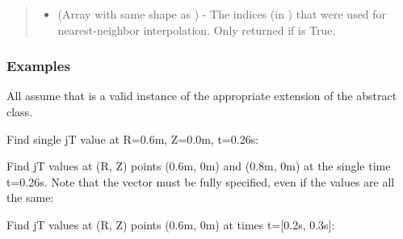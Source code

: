 \documentclass[letterpaper,10pt,english]{sphinxmanual}
\begin{document}
\begin{fulllineitems}
\begin{fulllineitems}
\begin{quote}
\begin{description}
\begin{itemize}
\item {} 
 (Array with same shape as ) - The indices
(in ) that were used for
nearest-neighbor interpolation. Only returned if  is
True.

\end{itemize}


\end{description}\end{quote}
\subsubsection*{Examples}

All assume that  is a valid instance of the appropriate
extension of the {\hyperref[\detokenize{eqtools:eqtools.core.Equilibrium}]{}} abstract class.

Find single jT value at R=0.6m, Z=0.0m, t=0.26s:

\begin{sphinxVerbatim}[commandchars=\\\{\}]
    
\end{sphinxVerbatim}

Find jT values at (R, Z) points (0.6m, 0m) and (0.8m, 0m) at the
single time t=0.26s. Note that the  vector must be fully
specified, even if the values are all the same:

\begin{sphinxVerbatim}[commandchars=\\\{\}]
  \PYG{p}{[} \PYG{p}{]} \PYG{p}{[} \PYG{p}{]} 
\end{sphinxVerbatim}

Find jT values at (R, Z) points (0.6m, 0m) at times t={[}0.2s, 0.3s{]}:

\begin{sphinxVerbatim}[commandchars=\\\{\}]
    \PYG{p}{[} \PYG{p}{]}
\end{sphinxVerbatim}


\end{fulllineitems}
\end{fulllineitems}
\end{document}
